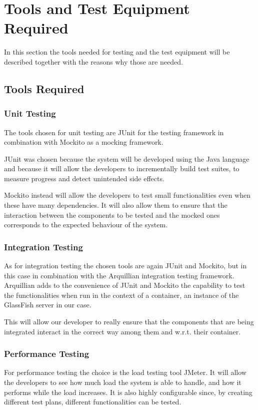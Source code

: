 \section{Tools and Test Equipment Required}

In this section the tools needed for testing and the test equipment will be described together with the reasons why those are needed.

\subsection{Tools Required}

\subsubsection{Unit Testing}
The tools chosen for unit testing are JUnit for the testing framework in combination with Mockito as a mocking framework.

JUnit was chosen because the system will be developed using the Java language and because it will allow the developers to incrementally build test suites, to measure progress and detect unintended side effects.

Mockito instead will allow the developers to test small functionalities even when these have many dependencies. It will also allow them to ensure that the interaction between the components to be tested and the mocked ones corresponds to the expected behaviour of the system.

\subsubsection{Integration Testing}
As for integration testing the chosen tools are again JUnit and Mockito, but in this case in combination with the Arquillian integration testing framework.
Arquillian adds to the convenience of JUnit and Mockito the capability to test the functionalities when run in the context of a container, an instance of the GlassFish server in our case.

This will allow our developer to really ensure that the components that are being integrated interact in the correct way among them and w.r.t. their container.

\subsubsection{Performance Testing}
For performance testing the choice is the load testing tool JMeter. It will allow the developers to see how much load the system is able to handle, and how it performs while the load increases. It is also highly configurable since, by creating different test plans, different functionalities can be tested.

